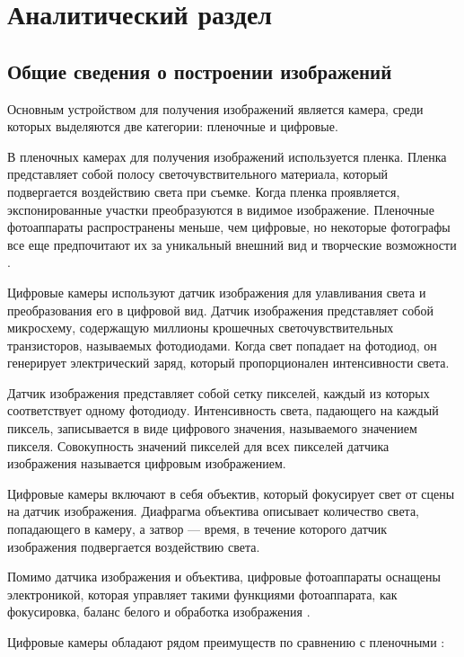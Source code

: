 \chapter{Аналитический раздел}

\section{Общие сведения о построении изображений}

Основным устройством для получения изображений является камера, среди которых выделяются две категории: пленочные и цифровые. 

В пленочных камерах для получения изображений используется пленка. Пленка представляет собой полосу светочувствительного материала, который подвергается воздействию света при съемке. Когда пленка проявляется, экспонированные участки преобразуются в видимое изображение. Пленочные фотоаппараты распространены меньше, чем цифровые, но некоторые фотографы все еще предпочитают их за уникальный внешний вид и творческие возможности \cite{filmcameras}.

Цифровые камеры используют датчик изображения для улавливания света и преобразования его в цифровой вид. Датчик изображения представляет собой микросхему, содержащую миллионы крошечных светочувствительных транзисторов, называемых фотодиодами. Когда свет попадает на фотодиод, он генерирует электрический заряд, который пропорционален интенсивности света.

Датчик изображения представляет собой сетку пикселей, каждый из которых соответствует одному фотодиоду. Интенсивность света, падающего на каждый пиксель, записывается в виде цифрового значения, называемого значением пикселя. Совокупность значений пикселей для всех пикселей датчика изображения называется цифровым изображением.

Цифровые камеры включают в себя объектив, который фокусирует свет от сцены на датчик изображения. Диафрагма объектива описывает количество света, попадающего в камеру, а затвор --- время, в течение которого датчик изображения подвергается воздействию света.

Помимо датчика изображения и объектива, цифровые фотоаппараты оснащены электроникой, которая управляет такими функциями фотоаппарата, как фокусировка, баланс белого и обработка изображения \cite{digitalcameras}.

Цифровые камеры обладают рядом преимуществ по сравнению с пленочными \cite{fvsdcameras}:

